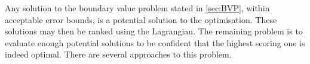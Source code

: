 Any solution to the boundary value problem stated in \autoref{sec:BVP}, within acceptable error bounds, is a potential solution to the optimisation. These solutions may then be ranked using the Lagrangian. The remaining problem is to evaluate enough potential solutions to be confident that the highest scoring one is indeed optimal. There are several approaches to this problem.



